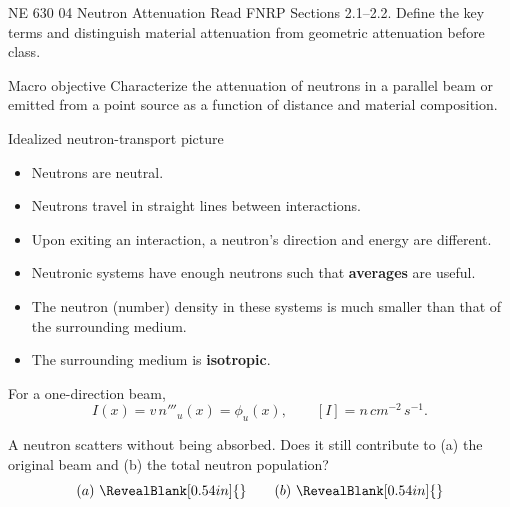 
\HandoutSetup
  {NE 630}
  {04}
  {Neutron Attenuation}
  {Read FNRP Sections 2.1--2.2. Define the key terms and distinguish material attenuation from geometric attenuation before class.}


\MakeHandoutTitle

\begin{handoutcolumns}

\begin{fixedbox}{Macro objective}
Characterize the attenuation of neutrons in a parallel beam or emitted from a
point source as a function of distance and material composition.
\end{fixedbox}



\begin{fixedbox}{Idealized neutron-transport picture}
\footnotesize
\begin{itemize}
  \item Neutrons are neutral.
  \item Neutrons travel in straight lines between interactions.
  \item Upon exiting an interaction, a neutron's direction and energy are different.
  \item Neutronic systems have enough neutrons such that {\bf averages} are useful.
  \item The neutron (number) density in these systems is much smaller than that of the surrounding medium.
  \item The surrounding medium is {\bf isotropic}.
\end{itemize}
For a one-direction beam,
\[
 I(x)=v\,n'''_u(x)=\phi_u(x),
 \qquad [I]=\unit{n\,cm^{-2}\,s^{-1}}.
\]
\normalsize
\end{fixedbox}

\begin{checkpoint}
A neutron scatters without being absorbed. Does it still contribute to
(a) the original beam and (b) the total neutron population?
\[
 (a)\ \RevealBlank[0.54in]{}
 \qquad
 (b)\ \RevealBlank[0.54in]{}
\]
\end{checkpoint}


\end{handoutcolumns}

